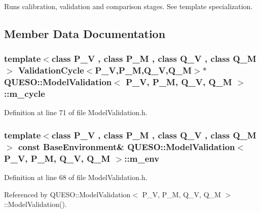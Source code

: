 Runs calibration, validation and comparison stages. See template specialization. 



\subsection{Member Data Documentation}
\hypertarget{class_q_u_e_s_o_1_1_model_validation_ac452e290711cc27c9f6cfd2a8242454f}{
\subsubsection[{m\-\_\-cycle}]{\setlength{\rightskip}{0pt plus 5cm}template$<$class P\-\_\-\-V , class P\-\_\-\-M , class Q\-\_\-\-V , class Q\-\_\-\-M $>$ {\bf Validation\-Cycle}$<$P\-\_\-\-V,P\-\_\-\-M,Q\-\_\-\-V,Q\-\_\-\-M$>$$\ast$ {\bf Q\-U\-E\-S\-O\-::\-Model\-Validation}$<$ P\-\_\-\-V, P\-\_\-\-M, Q\-\_\-\-V, Q\-\_\-\-M $>$\-::m\-\_\-cycle\hspace{0.3cm}{\ttfamily [protected]}}}\label{class_q_u_e_s_o_1_1_model_validation_ac452e290711cc27c9f6cfd2a8242454f}


Definition at line 71 of file Model\-Validation.\-h.

\hypertarget{class_q_u_e_s_o_1_1_model_validation_a357832c31f58c1bd11c10733317437ae}{
\subsubsection[{m\-\_\-env}]{\setlength{\rightskip}{0pt plus 5cm}template$<$class P\-\_\-\-V , class P\-\_\-\-M , class Q\-\_\-\-V , class Q\-\_\-\-M $>$ const {\bf Base\-Environment}\& {\bf Q\-U\-E\-S\-O\-::\-Model\-Validation}$<$ P\-\_\-\-V, P\-\_\-\-M, Q\-\_\-\-V, Q\-\_\-\-M $>$\-::m\-\_\-env\hspace{0.3cm}{\ttfamily [protected]}}}\label{class_q_u_e_s_o_1_1_model_validation_a357832c31f58c1bd11c10733317437ae}


Definition at line 68 of file Model\-Validation.\-h.



Referenced by Q\-U\-E\-S\-O\-::\-Model\-Validation$<$ P\-\_\-\-V, P\-\_\-\-M, Q\-\_\-\-V, Q\-\_\-\-M $>$\-::\-Model\-Validation().


